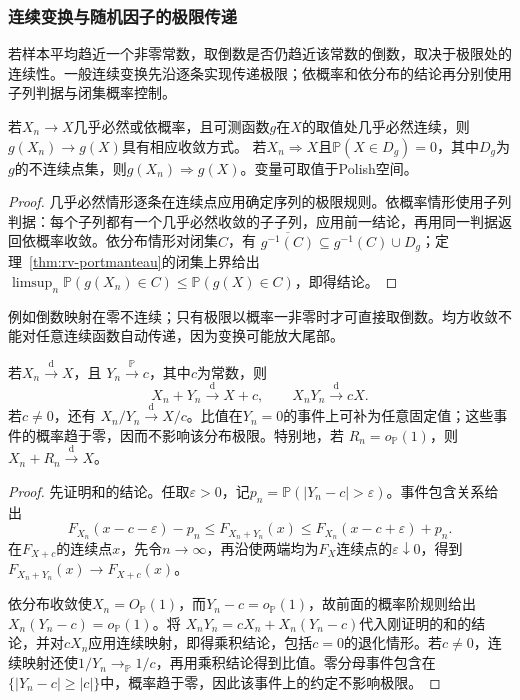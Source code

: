 \subsubsection{连续变换与随机因子的极限传递}
若样本平均趋近一个非零常数，取倒数是否仍趋近该常数的倒数，取决于极限处的连续性。一般连续变换先沿逐条实现传递极限；依概率和依分布的结论再分别使用子列判据与闭集概率控制。
\begin{theorem}[连续映射]
\label{thm:rv-continuous-mapping}
若\(X_n\to X\)几乎必然或依概率，且可测函数\(g\)在\(X\)的取值处几乎必然连续，则\(g(X_n)\to g(X)\)具有相应收敛方式。
若\(X_n\Rightarrow X\)且\(\mathbb P(X\in D_g)=0\)，其中\(D_g\)为\(g\)的不连续点集，则\(g(X_n)\Rightarrow g(X)\)。变量可取值于Polish空间。
\end{theorem}
\begin{proof}
几乎必然情形逐条在连续点应用确定序列的极限规则。依概率情形使用子列判据：每个子列都有一个几乎必然收敛的子子列，应用前一结论，再用同一判据返回依概率收敛。依分布情形对闭集\(C\)，有
\(\overline{g^{-1}(C)}\subseteq g^{-1}(C)\cup D_g\)；定理~\ref{thm:rv-portmanteau}的闭集上界给出
\(\limsup_n\mathbb P(g(X_n)\in C)\leq\mathbb P(g(X)\in C)\)，即得结论。
\end{proof}
例如倒数映射在零不连续；只有极限以概率一非零时才可直接取倒数。均方收敛不能对任意连续函数自动传递，因为变换可能放大尾部。
\begin{theorem}[Slutsky定理]
  \label{thm:statistics-slutsky}
  若\(X_n\xrightarrow{\mathrm d}X\)，且
  \(Y_n\xrightarrow{\mathbb{P}}c\)，其中\(c\)为常数，则
  \[
    X_n+Y_n\xrightarrow{\mathrm d}X+c,\qquad
    X_nY_n\xrightarrow{\mathrm d}cX.
  \]
  若\(c\neq0\)，还有
  \(X_n/Y_n\xrightarrow{\mathrm d}X/c\)。比值在\(Y_n=0\)的事件上可补为任意固定值；这些事件的概率趋于零，因而不影响该分布极限。特别地，若
  \(R_n=o_{\mathbb{P}}(1)\)，则
  \(X_n+R_n\xrightarrow{\mathrm d}X\)。
\end{theorem}

\begin{proof}
先证明和的结论。任取\(\varepsilon>0\)，记\(p_n=\mathbb P(|Y_n-c|>\varepsilon)\)。事件包含关系给出
\[
 F_{X_n}(x-c-\varepsilon)-p_n
 \leq F_{X_n+Y_n}(x)
 \leq F_{X_n}(x-c+\varepsilon)+p_n.
\]
在\(F_{X+c}\)的连续点\(x\)，先令\(n\to\infty\)，再沿使两端均为\(F_X\)连续点的\(\varepsilon\downarrow0\)，得到\(F_{X_n+Y_n}(x)\to F_{X+c}(x)\)。

依分布收敛使\(X_n=O_{\mathbb P}(1)\)，而\(Y_n-c=o_{\mathbb P}(1)\)，故前面的概率阶规则给出\(X_n(Y_n-c)=o_{\mathbb P}(1)\)。将
\(X_nY_n=cX_n+X_n(Y_n-c)\)代入刚证明的和的结论，并对\(cX_n\)应用连续映射，即得乘积结论，包括\(c=0\)的退化情形。若\(c\neq0\)，连续映射还使\(1/Y_n\to_{\mathbb P}1/c\)，再用乘积结论得到比值。零分母事件包含在\(\{|Y_n-c|\geq|c|\}\)中，概率趋于零，因此该事件上的约定不影响极限。
\end{proof}

